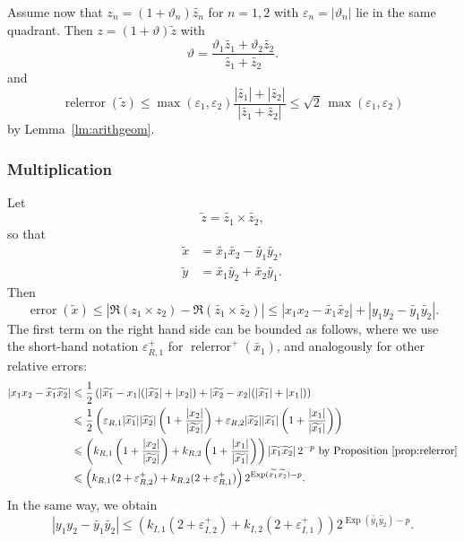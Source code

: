 \documentclass [11pt]{article}
\newcommand {\corr}[1]{{#1}}
\newcommand {\appro}[1]{\widetilde {#1}}
\DeclareMathOperator{\Exp}{\operatorname {Exp}}
\newcommand{\error}{\operatorname {error}}
\newcommand{\relerror}{\operatorname {relerror}}
\renewcommand {\epsilon}{\varepsilon}
\renewcommand {\theta}{\vartheta}
\renewcommand {\leq}{\leqslant}
\begin{document}
Assume now that $\corr {z_n} = (1 + \theta_n) \appro {z_n}$ for $n=1,2$
with $\epsilon_n = |\theta_n|$ lie in the same quadrant.
Then
$\corr z = (1 + \theta) \appro z$
with
\[
\theta = \frac {\theta_1 \appro {z_1} + \theta_2 \appro {z_2}}
               {\appro {z_1} + \appro {z_2}}.
\]
and
\begin {equation}
\label {eq:propaddrel}
\relerror (\appro z)
\leq
\max (\epsilon_1, \epsilon_2)
   \frac {|\appro {z_1}| + |\appro {z_2}|}{|\appro {z_1} + \appro {z_2}|}
\leq
\sqrt 2 \, \max (\epsilon_1, \epsilon_2)
\end {equation}
by Lemma~\ref {lm:arithgeom}.




\subsubsection {Multiplication}
\label {sssec:propmul}

Let
\[
\appro z = \appro {z_1} \times \appro {z_2},
\]
so that
\begin {align*}
\appro x & = \appro {x_1} \appro {x_2} - \appro {y_1} \appro {y_2}, \\
\appro y & = \appro {x_1} \appro {y_2} + \appro {x_2} \appro {y_1}.
\end {align*}
Then
\[
\error (\appro x)
\leq | \Re (\corr {z_1} \times \corr {z_2})
- \Re (\appro {z_1} \times \appro {z_2})|
\leq
| \corr {x_1} \corr {x_2} - \appro {x_1} \appro {x_2}|
+ | \corr {y_1} \corr {y_2} - \appro {y_1} \appro {y_2}|.
\]
The first term on the right hand side can be bounded as follows,
where we use the short-hand notation $\epsilon_{R, 1}^+$ for
$\relerror^+ (\appro {x_1})$, and analogously for other relative errors:
\begin{align*}
| \corr {x_1} \corr {x_2} - \appro {x_1} \appro {x_2}|
& \leq
\frac{1}{2} \left(
  |\appro {x_1} - \corr {x_1}| (|\appro {x_2}| + |\corr {x_2}|)
+ |\appro {x_2} - \corr {x_2}| (|\appro {x_1}| + |\corr {x_1}|)
\right)
\\
& \leq \frac {1}{2} \left(
  \epsilon_{R, 1} |\appro {x_1}| |\appro {x_2}|
  \left( 1 + \frac {|\corr {x_2}|}{|\appro {x_2}|} \right)
+ \epsilon_{R, 2} |\appro {x_2}| |\appro {x_1}|
  \left( 1 + \frac {|\corr {x_1}|}{|\appro {x_1}|} \right)
  \right)
\\
& \leq \left(
  k_{R, 1}
  \left( 1 + \frac {|\corr {x_2}|}{|\appro {x_2}|} \right)
+ k_{R, 2}
  \left( 1 + \frac {|\corr {x_1}|}{|\appro {x_1}|} \right)
  \right) |\appro {x_1} \appro {x_2}| \, 2^{-p}
  \text { by Proposition~\ref {prop:relerror}}
\\
& \leq \left(
   k_{R, 1} (2 + \epsilon_{R, 2}^+)
   + k_{R, 2} (2 + \epsilon_{R, 1}^+)
   \right) 2^{\Exp (\appro {x_1} \appro {x_2}) - p}.
\end{align*}
In the same way, we obtain
\[
| \corr {y_1} \corr {y_2} - \appro {y_1} \appro {y_2}|
\leq \left(
   k_{I, 1} (2 + \epsilon_{I, 2}^+)
   + k_{I, 2} (2 + \epsilon_{I, 1}^+)
   \right) 2^{\Exp (\appro {y_1} \appro {y_2}) - p}.
\]
\end{document}
